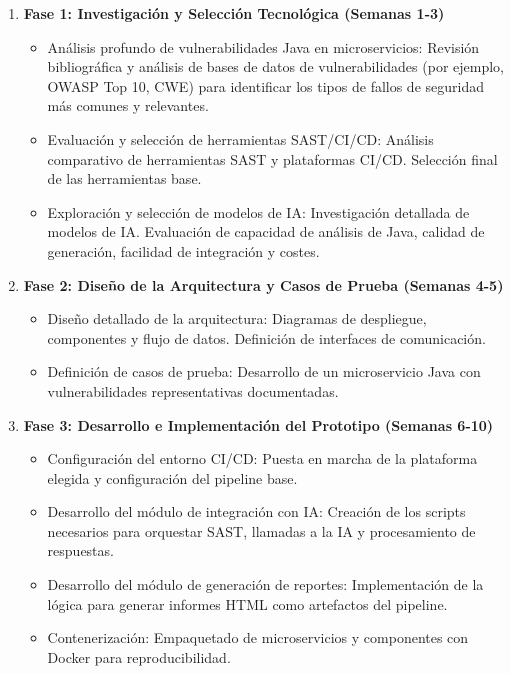 \begin{enumerate}
    \item \textbf{Fase 1: Investigación y Selección Tecnológica (Semanas 1-3)}
    \begin{itemize}
        \item Análisis profundo de vulnerabilidades Java en microservicios: Revisión bibliográfica y análisis de bases de datos de vulnerabilidades (por ejemplo, OWASP Top 10, CWE) para identificar los tipos de fallos de seguridad más comunes y relevantes.
        \item Evaluación y selección de herramientas SAST/CI/CD: Análisis comparativo de herramientas SAST y plataformas CI/CD. Selección final de las herramientas base.
        \item Exploración y selección de modelos de IA: Investigación detallada de modelos de IA. Evaluación de capacidad de análisis de Java, calidad de generación, facilidad de integración y costes.
    \end{itemize}
    
    \item \textbf{Fase 2: Diseño de la Arquitectura y Casos de Prueba (Semanas 4-5)}
    \begin{itemize}
        \item Diseño detallado de la arquitectura: Diagramas de despliegue, componentes y flujo de datos. Definición de interfaces de comunicación.
        \item Definición de casos de prueba: Desarrollo de un microservicio Java con vulnerabilidades representativas documentadas.
    \end{itemize}
    
    \item \textbf{Fase 3: Desarrollo e Implementación del Prototipo (Semanas 6-10)}
    \begin{itemize}
        \item Configuración del entorno CI/CD: Puesta en marcha de la plataforma elegida y configuración del pipeline base.
        \item Desarrollo del módulo de integración con IA: Creación de los scripts necesarios para orquestar SAST, llamadas a la IA y procesamiento de respuestas.
        \item Desarrollo del módulo de generación de reportes: Implementación de la lógica para generar informes HTML como artefactos del pipeline.
        \item Contenerización: Empaquetado de microservicios y componentes con Docker para reproducibilidad.
    \end{itemize}
    

\end{enumerate}
